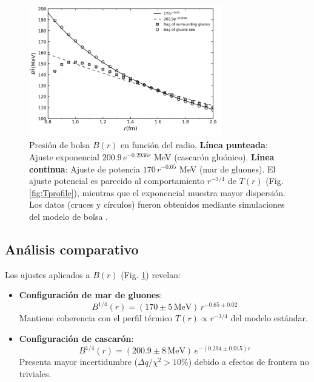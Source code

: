 \begin{figure}[h]
    \centering
    \includegraphics[width=0.75\textwidth]{./Images/B(R).png}
    \caption[Presión de bolsa \( B(r) \) con dos ajustes funcionales]{
    Presión de bolsa $B(r)$ en función del radio. 
    \textbf{Línea punteada}: Ajuste exponencial $200.9\,e^{-0.2936r}$ MeV (cascarón gluónico). 
    \textbf{Línea continua}: Ajuste de potencia $170\,r^{-0.65}$ MeV (mar de gluones). 
    El ajuste potencial es parecido al comportamiento $r^{-3/4}$ de $T(r)$ (Fig. \ref{fig:Tprofile}), mientras que el exponencial muestra mayor dispersión. 
    Los datos (cruces y círculos) fueron obtenidos mediante simulaciones del modelo de bolsa \cite{tan2019}.
    }
    \label{fig:Bpressure}
\end{figure}

\subsection{Análisis comparativo}
Los ajustes aplicados a $B(r)$ (Fig. \ref{fig:Bpressure}) revelan:

\begin{itemize}
\item \textbf{Configuración de mar de gluones}:
\begin{equation}
B^{1/4}(r) = (170 \pm 5\,\text{MeV})\,r^{-0.65 \pm 0.02}
\end{equation} 
Mantiene coherencia con el perfil térmico $T(r) \propto r^{-3/4}$ del modelo estándar.

\item \textbf{Configuración de cascarón}:
\begin{equation}
B^{1/4}(r) = (200.9 \pm 8\,\text{MeV})\,e^{-(0.294 \pm 0.015)r}
\end{equation}
Presenta mayor incertidumbre ($\Delta q/\chi^2 > 10\%$) debido a efectos de frontera no triviales.
\end{itemize}

